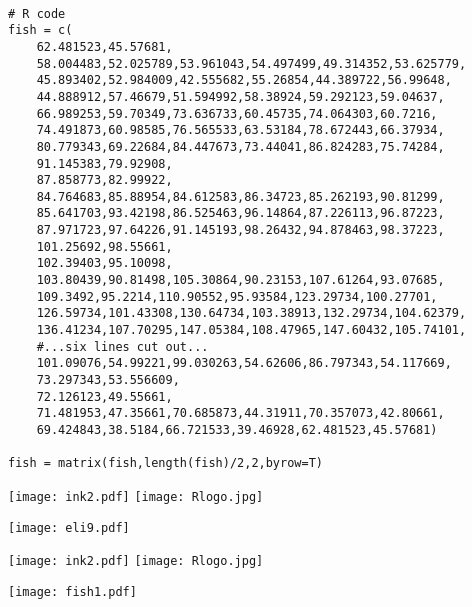 \documentclass[12pt,mathserif]{beamer}
\newcommand{\bl}[1]{\color{titleblue}{#1 }\color{black}}
\begin{document}
\begin{frame}[fragile]
\tiny
\begin{verbatim}







# R code
fish = c(
    62.481523,45.57681,
    58.004483,52.025789,53.961043,54.497499,49.314352,53.625779,
    45.893402,52.984009,42.555682,55.26854,44.389722,56.99648,
    44.888912,57.46679,51.594992,58.38924,59.292123,59.04637,
    66.989253,59.70349,73.636733,60.45735,74.064303,60.7216,
    74.491873,60.98585,76.565533,63.53184,78.672443,66.37934,
    80.779343,69.22684,84.447673,73.44041,86.824283,75.74284,
    91.145383,79.92908,
    87.858773,82.99922,
    84.764683,85.88954,84.612583,86.34723,85.262193,90.81299,
    85.641703,93.42198,86.525463,96.14864,87.226113,96.87223,
    87.971723,97.64226,91.145193,98.26432,94.878463,98.37223,
    101.25692,98.55661,
    102.39403,95.10098,
    103.80439,90.81498,105.30864,90.23153,107.61264,93.07685,
    109.3492,95.2214,110.90552,95.93584,123.29734,100.27701,
    126.59734,101.43308,130.64734,103.38913,132.29734,104.62379,
    136.41234,107.70295,147.05384,108.47965,147.60432,105.74101,
    #...six lines cut out...
    101.09076,54.99221,99.030263,54.62606,86.797343,54.117669,
    73.297343,53.556609,
    72.126123,49.55661,
    71.481953,47.35661,70.685873,44.31911,70.357073,42.80661,
    69.424843,38.5184,66.721533,39.46928,62.481523,45.57681)

fish = matrix(fish,length(fish)/2,2,byrow=T)
\end{verbatim}
\end{frame}


\begin{frame}
{\texttt{[image: ink2.pdf]} \textrightarrow \texttt{[image: Rlogo.jpg]} \hfill \hfill \hfill \bl{trace bitmap, export}}
\begin{center}\texttt{[image: eli9.pdf]}
\end{center}
\end{frame}


\begin{frame}
{\texttt{[image: ink2.pdf]} \textrightarrow \texttt{[image: Rlogo.jpg]} \hfill \hfill \hfill \bl{trace bitmap, export}}
\begin{center}\texttt{[image: fish1.pdf]}
\end{center}
\end{frame}
\end{document}
